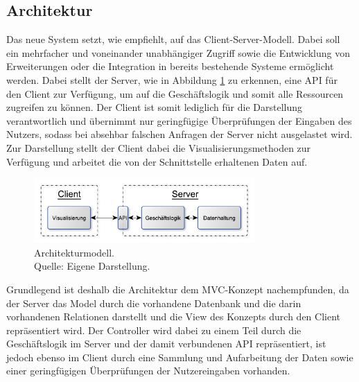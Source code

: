 \subsection{Architektur}
\label{ssec:Architektur}

Das neue System setzt, wie \citeauthor{MS-Fielding.} empfiehlt, auf das Client-Server-Modell. Dabei soll ein mehrfacher und voneinander unabhängiger Zugriff sowie die Entwicklung von Erweiterungen oder die Integration in bereits bestehende Systeme ermöglicht werden.
Dabei stellt der Server, wie in Abbildung \ref{img:einkaufBPMN} zu erkennen, eine \ac{API} für den Client zur Verfügung, um auf die Geschäftslogik und somit alle Ressourcen zugreifen zu können.
Der Client ist somit lediglich für die Darstellung verantwortlich und übernimmt nur geringfügige Überprüfungen der Eingaben des Nutzers, sodass bei absehbar falschen Anfragen der Server nicht ausgelastet wird.
Zur Darstellung stellt der Client dabei die Visualisierungsmethoden zur Verfügung und arbeitet die von der Schnittstelle erhaltenen Daten auf.

\begin{figure}[h]
  \centering
  \includegraphics[width=0.75\textwidth]{img/konzeption/gesamtkonzept/Architektur.pdf}
  \captionsetup{format=hang,justification=raggedright,singlelinecheck=false}
  \caption[Architekturmodell]{Architekturmodell. \\Quelle: Eigene Darstellung.}
  \label{img:einkaufBPMN}
\end{figure}

Grundlegend ist deshalb die Architektur dem \ac{MVC}-Konzept nachempfunden, da der Server das Model durch die vorhandene Datenbank und die darin vorhandenen Relationen darstellt und die View des Konzepts durch den Client repräsentiert wird.
Der Controller wird dabei zu einem Teil durch die Geschäftslogik im Server und der damit verbundenen \ac{API} repräsentiert, ist jedoch ebenso im Client durch eine Sammlung und Aufarbeitung der Daten sowie einer geringfügigen Überprüfungen der Nutzereingaben vorhanden.\autocite{rf-leff2001web}
